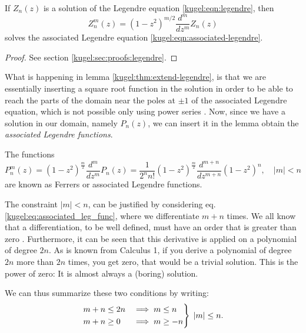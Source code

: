 \begin{lemma} \label{kugel:thm:extend-legendre}
  If $Z_n(z)$ is a solution of the Legendre equation \eqref{kugel:eqn:legendre},
  then
  \begin{equation*}
    Z^m_n(z) = (1 - z^2)^{m/2} \frac{d^m}{dz^m}Z_n(z)
  \end{equation*}
  solves the associated Legendre equation \eqref{kugel:eqn:associated-legendre}.
  \nocite{bell_special_2004}
\end{lemma}
\begin{proof}
  See section \ref{kugel:sec:proofs:legendre}.
\end{proof}

What is happening in lemma \ref{kugel:thm:extend-legendre}, is that we are
essentially inserting a square root function in the solution in order to be able
to reach the parts of the domain near the poles at $\pm 1$ of the associated
Legendre equation, which is not possible only using power series
. Now, since
we have a solution in our domain, namely $P_n(z)$, we can insert it in the lemma 
obtain the \emph{associated Legendre functions}.

\begin{definition}
  \label{kugel:def:ferrers-functions}
  The functions
  \begin{equation}
    P^m_n (z) = (1-z^2)^{\frac{m}{2}}\frac{d^{m}}{dz^{m}} P_n(z)
      = \frac{1}{2^n n!}(1-z^2)^{\frac{m}{2}}\frac{d^{m+n}}{dz^{m+n}}(1-z^2)^n, \quad |m|<n
  \end{equation}
  are known as Ferrers or associated Legendre functions.
\end{definition}
The constraint $|m|<n$, can be justified by considering eq.\eqref{kugel:eq:associated_leg_func}, where we differentiate $m+n$ times. We all know that a differentiation, to be well defined, must have an order that is greater than zero . Furthermore, it can be seen that this derivative is applied on a polynomial of degree $2n$. As is known from Calculus 1, if you derive a polynomial of degree $2n$ more than $2n$ times, you get zero, that would be a trivial solution. This is the power of zero: It is almost always a (boring) solution.

We can thus summarize these two conditions by writing:
\begin{equation*}
    \begin{rcases}
        m+n \leq 2n &\implies m \leq n \\
        m+n \geq 0  &\implies  m \geq -n
    \end{rcases} \; |m| \leq n.
\end{equation*}

